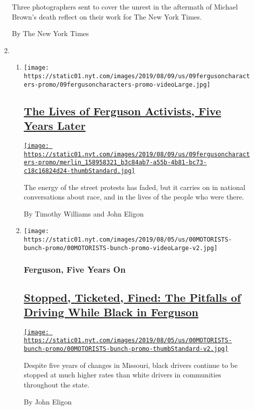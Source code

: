 \begin{enumerate}
  Three photographers sent to cover the unrest in the aftermath of
  Michael Brown's death reflect on their work for The New York Times.

  By The New York Times
\item
  \begin{enumerate}
  \def\labelenumii{\arabic{enumii}.}
  \item
    \texttt{[image: https://static01.nyt.com/images/2019/08/09/us/09fergusoncharacters-promo/09fergusoncharacters-promo-videoLarge.jpg]}

    \hypertarget{the-lives-of-ferguson-activists-five-years-later}{%
    \subsection{\texorpdfstring{\href{/2019/08/09/us/ferguson-activists.html}{The
    Lives of Ferguson Activists, Five Years
    Later}}{The Lives of Ferguson Activists, Five Years Later}}\label{the-lives-of-ferguson-activists-five-years-later}}

    \href{/2019/08/09/us/ferguson-activists.html}{\texttt{[image: https://static01.nyt.com/images/2019/08/09/us/09fergusoncharacters-promo/merlin\_158958321\_b3c84ab7-a55b-4b81-bc73-c18c16824d24-thumbStandard.jpg]}}

    The energy of the street protests has faded, but it carries on in
    national conversations about race, and in the lives of the people
    who were there.

    By Timothy Williams and John Eligon
  \item
    \texttt{[image: https://static01.nyt.com/images/2019/08/05/us/00MOTORISTS-bunch-promo/00MOTORISTS-bunch-promo-videoLarge-v2.jpg]}

    \hypertarget{ferguson-five-years-on-1}{%
    \subsubsection{Ferguson, Five Years
    On}\label{ferguson-five-years-on-1}}

    \hypertarget{stopped-ticketed-fined-the-pitfalls-of-driving-while-black-in-ferguson}{%
    \subsection{\texorpdfstring{\href{/2019/08/06/us/black-drivers-traffic-stops.html}{Stopped,
    Ticketed, Fined: The Pitfalls of Driving While Black in
    Ferguson}}{Stopped, Ticketed, Fined: The Pitfalls of Driving While Black in Ferguson}}\label{stopped-ticketed-fined-the-pitfalls-of-driving-while-black-in-ferguson}}

    \href{/2019/08/06/us/black-drivers-traffic-stops.html}{\texttt{[image: https://static01.nyt.com/images/2019/08/05/us/00MOTORISTS-bunch-promo/00MOTORISTS-bunch-promo-thumbStandard-v2.jpg]}}

    Despite five years of changes in Missouri, black drivers continue to
    be stopped at much higher rates than white drivers in communities
    throughout the state.

    By John Eligon
  \end{enumerate}
\end{enumerate}

